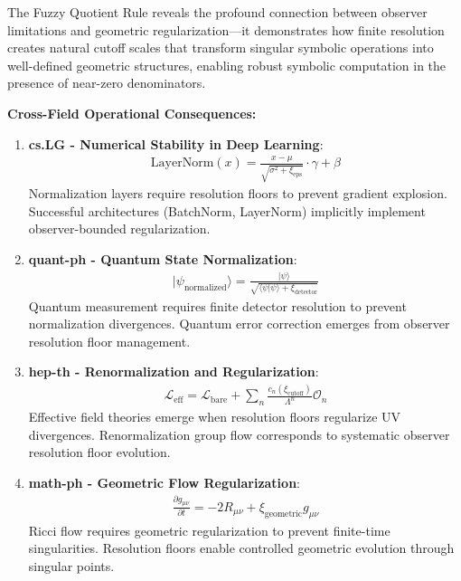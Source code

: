 \begin{scholium}
\label{scholium:bk4_symbolic_regularization}
The Fuzzy Quotient Rule reveals the profound connection between observer limitations and geometric regularization—it demonstrates how finite resolution creates natural cutoff scales that transform singular symbolic operations into well-defined geometric structures, enabling robust symbolic computation in the presence of near-zero denominators.

\textbf{Cross-Field Operational Consequences:}

\begin{enumerate}
\item \textbf{cs.LG - Numerical Stability in Deep Learning}: 
   \begin{align}
   \text{LayerNorm}(x) = \frac{x - \mu}{\sqrt{\sigma^2 + \xi_{\text{eps}}}} \cdot \gamma + \beta
   \end{align}
   Normalization layers require resolution floors to prevent gradient explosion. Successful architectures (BatchNorm, LayerNorm) implicitly implement observer-bounded regularization.

\item \textbf{quant-ph - Quantum State Normalization}:
   \begin{align}
   |\psi_{\text{normalized}}\rangle = \frac{|\psi\rangle}{\sqrt{\langle \psi | \psi \rangle + \xi_{\text{detector}}}}
   \end{align}
   Quantum measurement requires finite detector resolution to prevent normalization divergences. Quantum error correction emerges from observer resolution floor management.

\item \textbf{hep-th - Renormalization and Regularization}:
   \begin{align}
   \mathcal{L}_{\text{eff}} = \mathcal{L}_{\text{bare}} + \sum_{n} \frac{c_n(\xi_{\text{cutoff}})}{\Lambda^n} \mathcal{O}_n
   \end{align}
   Effective field theories emerge when resolution floors regularize UV divergences. Renormalization group flow corresponds to systematic observer resolution floor evolution.

\item \textbf{math-ph - Geometric Flow Regularization}:
   \begin{align}
   \frac{\partial g_{\mu\nu}}{\partial t} = -2R_{\mu\nu} + \xi_{\text{geometric}} g_{\mu\nu}
   \end{align}
   Ricci flow requires geometric regularization to prevent finite-time singularities. Resolution floors enable controlled geometric evolution through singular points.


\end{enumerate}
\end{scholium}
